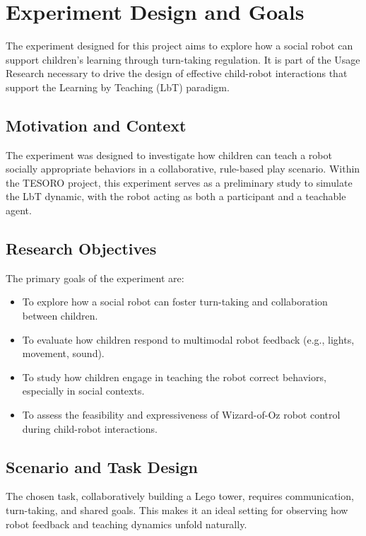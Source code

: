 \documentclass[a4paper]{usiinfbachelorproject}
\begin{document}
\section{\textbf{Experiment Design and Goals}}\label{sec:design}

The experiment designed for this project aims to explore how a social robot can support children's learning through turn-taking regulation.
It is part of the Usage Research necessary to drive the design of effective child-robot interactions that support the Learning by Teaching (LbT) paradigm.

\subsection*{\textbf{Motivation and Context}}
The experiment was designed to investigate how children can teach a robot socially appropriate behaviors in a collaborative, rule-based play scenario.
Within the TESORO project, this experiment serves as a preliminary study to simulate the LbT dynamic, with the robot acting as both a participant and a teachable agent.

\subsection*{\textbf{Research Objectives}}
The primary goals of the experiment are:
\begin{itemize}
    \item To explore how a social robot can foster turn-taking and collaboration between children.
    \item To evaluate how children respond to multimodal robot feedback (e.g., lights, movement, sound).
    \item To study how children engage in teaching the robot correct behaviors, especially in social contexts.
    \item To assess the feasibility and expressiveness of Wizard-of-Oz robot control during child-robot interactions.
\end{itemize}

\subsection*{\textbf{Scenario and Task Design}}
The chosen task, collaboratively building a Lego tower, requires communication, turn-taking, and shared goals.
This makes it an ideal setting for observing how robot feedback and teaching dynamics unfold naturally.
\end{document}
